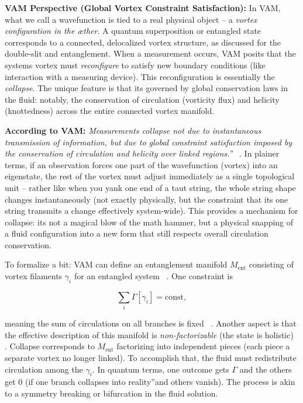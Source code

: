 \documentclass[a4paper, aps,preprint,superscriptaddress, 12pt]{revtex4}
\begin{document}
\textbf{VAM Perspective (Global Vortex Constraint Satisfaction):} In VAM, what we call a wavefunction is tied to a real physical object – a \textit{vortex configuration in the æther}. A quantum superposition or entangled state corresponds to a connected, delocalized vortex structure, as discussed for the double-slit and entanglement. When a measurement occurs, VAM posits that the system\rqs s vortex must \textit{reconfigure} to satisfy new boundary conditions (like interaction with a measuring device). This reconfiguration is essentially the \textit{collapse}. The unique feature is that it\rqs s governed by global conservation laws in the fluid: notably, the conservation of circulation (vorticity flux) and helicity (knottedness) across the entire connected vortex manifold.


\textbf{According to VAM:} \textit{\grqq Measurements collapse not due to instantaneous transmission of information, but due to global constraint satisfaction imposed by the conservation of circulation and helicity over linked regions.\textquotedblright}~\cite{Iskandarani2025c} . In plainer terms, if an observation forces one part of the wavefunction (vortex) into an eigenstate, the rest of the vortex must adjust immediately as a single topological unit – rather like when you yank one end of a taut string, the whole string shape changes instantaneously (not exactly physically, but the constraint that it\rqs s one string transmits a change effectively system-wide). This provides a mechanism for collapse: it\rqs s not a magical blow of the math hammer, but a physical snapping of a fluid configuration into a new form that still respects overall circulation conservation.


To formalize a bit: VAM can define an entanglement manifold $M_{\text{ent}}$ consisting of vortex filaments ${\gamma_i}$ for an entangled system~\cite{Iskandarani2025c} . One constraint is

\begin{equation}
    \sum_i \Gamma[\gamma_i] = \text{const},
\end{equation}

meaning the sum of circulations on all branches is fixed~\cite{Iskandarani2025c} . Another aspect is that the effective description of this manifold is \textit{non-factorizable} (the state is holistic)~\cite{Iskandarani2025c} . Collapse corresponds to $M_{\text{ent}}$ factorizing into independent pieces (each piece a separate vortex no longer linked). To accomplish that, the fluid must redistribute circulation among the $\gamma_i$. In quantum terms, one outcome gets $\Gamma$ and the others get 0 (if one branch \grqq collapses into reality\textquotedblright and others vanish). The process is akin to a symmetry breaking or bifurcation in the fluid solution.
\end{document}
